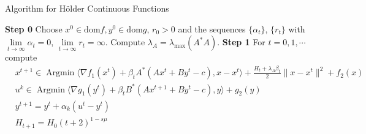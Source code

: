 \documentclass{article}
\numberwithin{equation}{section}
\def\Argmin{\mathop{\mathrm{Argmin}}}
\begin{document}
\begin{algorithm}
	\caption{ Algorithm for H\"older Continuous Functions}
	\label{alg2}
	\begin{algorithmic}
		\STATE \textbf{Step 0} Choose $x^0 \in \mathrm{dom}f, y^0 \in \mathrm{dom}g$, $r_0 >0$ and the sequences $\{\alpha_t\}$,
        $\{r_t\}$ with $\lim\limits_{t\rightarrow \infty}\alpha_t = 0$, $\lim\limits_{t\rightarrow\infty}r_t=\infty$. Compute $\lambda_A= \lambda_{\max}({A^*A})$.
		\STATE \textbf{Step 1} For $t=0,1,\cdots$ compute
            \begin{align}
                &x^{t+1} \in \Argmin \langle \nabla f_1(x^t) + \beta_{t}A^*(Ax^t+By^t-c), x-x^t\rangle +\frac{H_t+\lambda_{A} \beta_{t}}{2}\|x-x^t\rVert^2 +f_2(x) \label{get_xk+1_holder}  \\
                & u^k \in \Argmin \langle\nabla g_1(y^t) + \beta_{t}B^*(Ax^{t+1} +By^t-c),y\rangle +g_2(y) \label{get_uk_holder}  \\
                & y^{t+1} = y^{t} +\alpha_k(u^t-y^t)  \label{get_y_k_holder} \\
                & H_{t+1} = H_0(t+2)^{1-s\mu}
            \end{align}
	\end{algorithmic}  
\end{algorithm}
\end{document}
